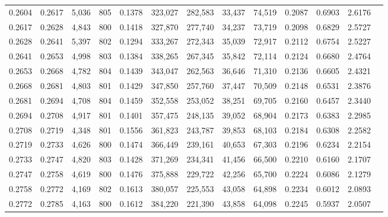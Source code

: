 \begin{tabular}{rrrrrrrrrrrrr}
0.2604 & 0.2617 &  5,036 & 805 &                                     0.1378 & 323,027 & 282,583 &  33,437 &  74,519 & 0.2087 & 0.6903 & 2.6176 \\
0.2617 & 0.2628 &  4,843 & 800 &                                     0.1418 & 327,870 & 277,740 &  34,237 &  73,719 & 0.2098 & 0.6829 & 2.5727 \\
0.2628 & 0.2641 &  5,397 & 802 &                                     0.1294 & 333,267 & 272,343 &  35,039 &  72,917 & 0.2112 & 0.6754 & 2.5227 \\
0.2641 & 0.2653 &  4,998 & 803 &                                     0.1384 & 338,265 & 267,345 &  35,842 &  72,114 & 0.2124 & 0.6680 & 2.4764 \\
0.2653 & 0.2668 &  4,782 & 804 &                                     0.1439 & 343,047 & 262,563 &  36,646 &  71,310 & 0.2136 & 0.6605 & 2.4321 \\
0.2668 & 0.2681 &  4,803 & 801 &                                     0.1429 & 347,850 & 257,760 &  37,447 &  70,509 & 0.2148 & 0.6531 & 2.3876 \\
0.2681 & 0.2694 &  4,708 & 804 &                                     0.1459 & 352,558 & 253,052 &  38,251 &  69,705 & 0.2160 & 0.6457 & 2.3440 \\
0.2694 & 0.2708 &  4,917 & 801 &                                     0.1401 & 357,475 & 248,135 &  39,052 &  68,904 & 0.2173 & 0.6383 & 2.2985 \\
0.2708 & 0.2719 &  4,348 & 801 &                                     0.1556 & 361,823 & 243,787 &  39,853 &  68,103 & 0.2184 & 0.6308 & 2.2582 \\
0.2719 & 0.2733 &  4,626 & 800 &                                     0.1474 & 366,449 & 239,161 &  40,653 &  67,303 & 0.2196 & 0.6234 & 2.2154 \\
0.2733 & 0.2747 &  4,820 & 803 &                                     0.1428 & 371,269 & 234,341 &  41,456 &  66,500 & 0.2210 & 0.6160 & 2.1707 \\
0.2747 & 0.2758 &  4,619 & 800 &                                     0.1476 & 375,888 & 229,722 &  42,256 &  65,700 & 0.2224 & 0.6086 & 2.1279 \\
0.2758 & 0.2772 &  4,169 & 802 &                                     0.1613 & 380,057 & 225,553 &  43,058 &  64,898 & 0.2234 & 0.6012 & 2.0893 \\
0.2772 & 0.2785 &  4,163 & 800 &                                     0.1612 & 384,220 & 221,390 &  43,858 &  64,098 & 0.2245 & 0.5937 & 2.0507 \\

\end{tabular}
